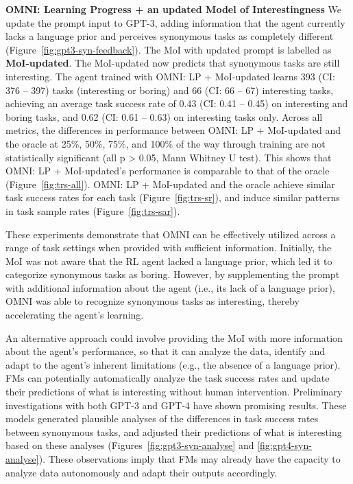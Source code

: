 \documentclass{article} %
\begin{document}
\textbf{OMNI: Learning Progress + an updated Model of Interestingness}
We update the prompt input to GPT-3, adding information that the agent currently lacks a language prior and perceives synonymous tasks as completely different (Figure~\ref{fig:gpt3-syn-feedback}). The MoI with updated prompt is labelled as \textbf{MoI-updated}. The MoI-updated now predicts that synonymous tasks are still interesting. The agent trained with OMNI: LP + MoI-updated learns 393 (CI: 376 -- 397) tasks (interesting or boring) and 66 (CI: 66 -- 67) interesting tasks, achieving an average task success rate of 0.43 (CI: 0.41 -- 0.45) on interesting and boring tasks, and 0.62 (CI: 0.61 -- 0.63) on interesting tasks only. Across all metrics, the differences in performance between OMNI: LP + MoI-updated and the oracle at 25\%, 50\%, 75\%, and 100\% of the way through training are not statistically significant (all p > 0.05, Mann Whitney U test). This shows that OMNI: LP + MoI-updated's performance is comparable to that of the oracle (Figure~\ref{fig:trs-all}). OMNI: LP + MoI-updated and the oracle achieve similar task success rates for each task (Figure~\ref{fig:trs-sr}), and induce similar patterns in task sample rates (Figure~\ref{fig:trs-sar}).

These experiments demonstrate that OMNI can be effectively utilized across a range of task settings when provided with sufficient information. Initially, the MoI was not aware that the RL agent lacked a language prior, which led it to categorize synonymous tasks as boring. However, by supplementing the prompt with additional information about the agent (i.e., its lack of a language prior), OMNI was able to recognize synonymous tasks as interesting, thereby accelerating the agent's learning.

An alternative approach could involve providing the MoI with more information about the agent's performance, so that it can analyze the data, identify and adapt to the agent's inherent limitations (e.g., the absence of a language prior). FMs can potentially automatically analyze the task success rates and update their predictions of what is interesting without human intervention. Preliminary investigations with both GPT-3 and GPT-4 have shown promising results. These models generated plausible analyses of the differences in task success rates between synonymous tasks, and adjusted their predictions of what is interesting based on these analyses (Figures~\ref{fig:gpt3-syn-analyse} and \ref{fig:gpt4-syn-analyse}). These observations imply that FMs may already have the capacity to analyze data autonomously and adapt their outputs accordingly.
\end{document}
